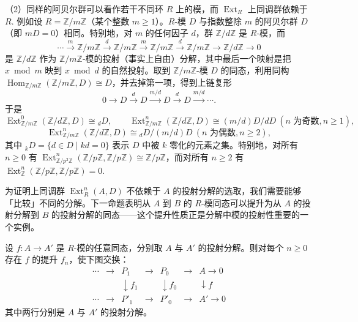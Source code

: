 （2）同样的阿贝尔群可以看作若干不同环 \(R\) 上的模，而 \(\operatorname{Ext}_R\) 上同调群依赖于 \(R\). 例如设 \(R = \mathbb{Z}/m\mathbb{Z}\)（某个整数 \(m \geq 1\)）。\(R\)-模 \(D\) 与指数整除 \(m\) 的阿贝尔群 \(D\)（即 \(mD = 0\)）相同。特别地，对 \(m\) 的任何因子 \(d\)，群 \(\mathbb{Z}/d\mathbb{Z}\) 是 \(R\)-模，而
\[
\cdots \xrightarrow{m} \mathbb{Z}/m\mathbb{Z} \xrightarrow{d} \mathbb{Z}/m\mathbb{Z} \xrightarrow{m} \mathbb{Z}/m\mathbb{Z} \xrightarrow{d} \mathbb{Z}/m\mathbb{Z} \to \mathbb{Z}/d\mathbb{Z} \to 0
\]
是 \(\mathbb{Z}/d\mathbb{Z}\) 作为 \(\mathbb{Z}/m\mathbb{Z}\)-模的投射（事实上自由）分解，其中最后一个映射是把 \(x \bmod m\) 映到 \(x \bmod d\) 的自然投射。取到 \(\mathbb{Z}/m\mathbb{Z}\)-模 \(D\) 的同态，利用同构 \(\operatorname{Hom}_{\mathbb{Z}/m\mathbb{Z}}(\mathbb{Z}/m\mathbb{Z}, D) \cong D\)，并去掉第一项，得到上链复形
\[
0 \to D \xrightarrow{d} D \xrightarrow{m/d} D \xrightarrow{d} D \xrightarrow{m/d} \cdots.
\]
于是
\[
\operatorname{Ext}_{\mathbb{Z}/m\mathbb{Z}}^0(\mathbb{Z}/d\mathbb{Z}, D) \cong {}_dD, \qquad \operatorname{Ext}_{\mathbb{Z}/m\mathbb{Z}}^n(\mathbb{Z}/d\mathbb{Z}, D) \cong (m/d)D/dD \ (n \text{ 为奇数}, n \geq 1),
\]
\[
\operatorname{Ext}_{\mathbb{Z}/m\mathbb{Z}}^n(\mathbb{Z}/d\mathbb{Z}, D) \cong {}_dD/(m/d)D \ (n \text{ 为偶数}, n \geq 2),
\]
其中 \({}_kD = \{d \in D \mid kd = 0\}\) 表示 \(D\) 中被 \(k\) 零化的元素之集。特别地，对所有 \(n \geq 0\) 有 \(\operatorname{Ext}_{\mathbb{Z}/p^2\mathbb{Z}}^n(\mathbb{Z}/p\mathbb{Z}, \mathbb{Z}/p\mathbb{Z}) \cong \mathbb{Z}/p\mathbb{Z}\)，而对所有 \(n \geq 2\) 有 \(\operatorname{Ext}_{\mathbb{Z}}^n(\mathbb{Z}/p\mathbb{Z}, \mathbb{Z}/p\mathbb{Z}) = 0\).

为证明上同调群 \(\operatorname{Ext}_R^n(A, D)\) 不依赖于 \(A\) 的投射分解的选取，我们需要能够「比较」不同的分解。下一命题表明从 \(A\) 到 \(B\) 的 \(R\)-模同态可以提升为从 \(A\) 的投射分解到 \(B\) 的投射分解的同态——这个提升性质正是分解中模的投射性重要的一个实例。

\begin{proposition}\label{pro:17.4}
设 \(f : A \to A'\) 是 \(R\)-模的任意同态，分别取 \(A\) 与 \(A'\) 的投射分解。则对每个 \(n \geq 0\) 存在 \(f\) 的提升 \(f_n\)，使下图交换：
\[
\begin{array}{ccccccc}
\cdots & \to & P_1 & \to & P_0 & \to & A \to 0\\
& & \downarrow f_1 & & \downarrow f_0 & & \downarrow f\\
\cdots & \to & P'_1 & \to & P'_0 & \to & A' \to 0
\end{array} \tag{17.8}
\]
其中两行分别是 \(A\) 与 \(A'\) 的投射分解。
\end{proposition}

